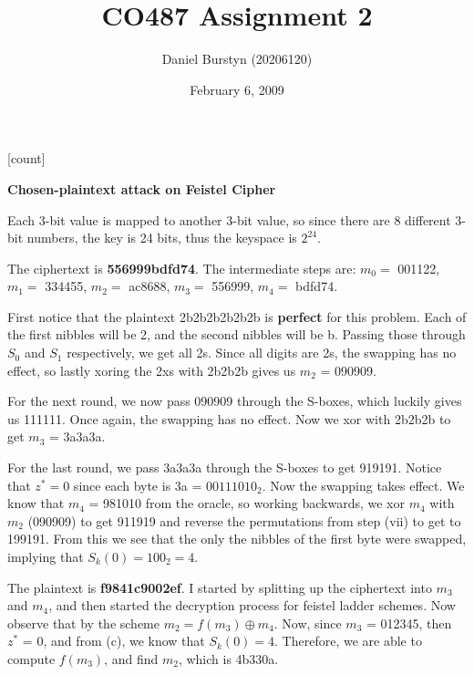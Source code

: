 \documentclass[12pt]{article}
\title{CO487 Assignment 2}
\author{Daniel Burstyn (20206120)}
\date{February 6, 2009}
\begin{document}
\maketitle
{}
[count]
\begin{list}{.}{}

\item \textbf{Chosen-plaintext attack on Feistel Cipher}
\begin{list}{)}{}

\item Each 3-bit value is mapped to another 3-bit value, so since there are 8
different 3-bit numbers, the key is 24 bits, thus the keyspace is $2^{24}$.

\item The ciphertext is \textbf{556999bdfd74}.  The intermediate steps are: $m_0
= $ 001122, $m_1 = $ 334455, $m_2 = $ ac8688, $m_3 = $ 556999, $m_4 = $ bdfd74.

\item First notice that the plaintext 2b2b2b2b2b2b is \textbf{perfect} for this
problem.  Each of the first nibbles will be 2, and the second nibbles will be b.
Passing those through $S_0$ and $S_1$ respectively, we get all 2s.  Since all
digits are 2s, the swapping has no effect, so lastly xoring the 2xs with 2b2b2b
gives us $m_2$ = 090909.

For the next round, we now pass 090909 through the S-boxes, which luckily gives
us 111111.  Once again, the swapping has no effect.  Now we xor with 2b2b2b to
get $m_3$ = 3a3a3a.

For the last round, we pass 3a3a3a through the S-boxes to get 919191.  Notice
that $z^* = 0$ since each byte is 3a = $00111010_2$.  Now the swapping takes
effect.  We know that $m_4$ = 981010 from the oracle, so working backwards, we
xor $m_4$ with $m_2$ (090909) to get 911919 and reverse the permutations from
step (vii) to get to 199191.  From this we see that the only the nibbles of the
first byte were swapped, implying that $S_k(0) = 100_2 = 4$.

\item The plaintext is \textbf{f9841c9002ef}.  I started by splitting up the
ciphertext into $m_3$ and $m_4$, and then started the decryption process for
feistel ladder schemes.  Now observe that by the scheme $m_2 = f(m_3) \oplus
m_4$.  Now, since $m_3$ = 012345, then $z^*$ = 0, and from (c), we know that
$S_k(0) = 4$.  Therefore, we are able to compute $f(m_3)$, and find $m_2$, which
is 4b330a.


\end{list}
\end{list}
\end{document}
